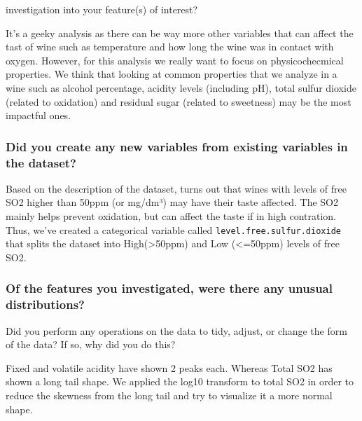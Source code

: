 \documentclass[]{article}
\begin{document}
investigation into your feature(s) of interest?

It's a geeky analysis as there can be way more other variables that can
affect the tast of wine such as temperature and how long the wine was in
contact with oxygen. However, for this analysis we really want to focus
on physicochecmical properties. We think that looking at common
properties that we analyze in a wine such as alcohol percentage, acidity
levels (including pH), total sulfur dioxide (related to oxidation) and
residual sugar (related to sweetness) may be the most impactful ones.

\hypertarget{did-you-create-any-new-variables-from-existing-variables-in-the-dataset}{%
\subsubsection{Did you create any new variables from existing variables
in the
dataset?}\label{did-you-create-any-new-variables-from-existing-variables-in-the-dataset}}

Based on the description of the dataset, turns out that wines with
levels of free SO2 higher than 50ppm (or mg/dm³) may have their taste
affected. The SO2 mainly helps prevent oxidation, but can affect the
taste if in high contration. Thus, we've created a categorical variable
called \texttt{level.free.sulfur.dioxide} that splits the dataset into
High(\textgreater{}50ppm) and Low (\textless{}=50ppm) levels of free
SO2.

\hypertarget{of-the-features-you-investigated-were-there-any-unusual-distributions}{%
\subsubsection{\texorpdfstring{Of the features you investigated, were
there any unusual distributions?\\
}{Of the features you investigated, were there any unusual distributions? }}\label{of-the-features-you-investigated-were-there-any-unusual-distributions}}

Did you perform any operations on the data to tidy, adjust, or change
the form\\
of the data? If so, why did you do this?

Fixed and volatile acidity have shown 2 peaks each. Whereas Total SO2
has shown a long tail shape. We applied the log10 transform to total SO2
in order to reduce the skewness from the long tail and try to visualize
it a more normal shape.
\end{document}
